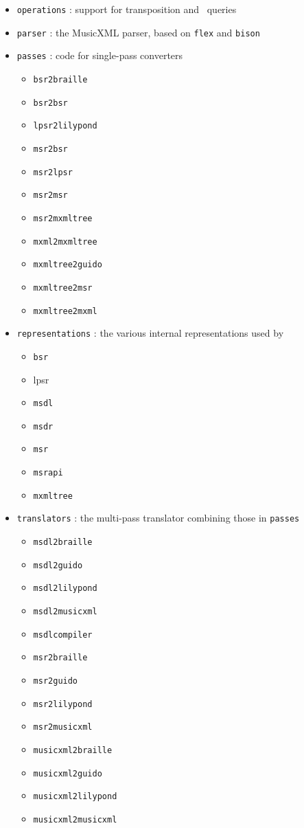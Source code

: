 \documentclass[12pt,a4paper]{article}
\begin{document}
\begin{itemize}
\item {\tt operations} : support for transposition and \mxml\ queries

\item {\tt parser} : the MusicXML parser, based on {\tt flex} and {\tt bison}

\item {\tt passes} : code for single-pass converters

  \begin{itemize}
  \item {\tt bsr2braille}
  \item {\tt bsr2bsr}
  \item {\tt lpsr2lilypond}
  \item {\tt msr2bsr}
  \item {\tt msr2lpsr}
  \item {\tt msr2msr}
  \item {\tt msr2mxmltree}
  \item {\tt mxml2mxmltree}
  \item {\tt mxmltree2guido}
  \item {\tt mxmltree2msr}
  \item {\tt mxmltree2mxml}
  \end{itemize}

\item {\tt representations} : the various internal representations used by \lib\

  \begin{itemize}
  \item {\tt bsr}
  \item {lpsr}
  \item {\tt msdl}
  \item {\tt msdr}
  \item {\tt msr}
  \item {\tt msrapi}
  \item {\tt mxmltree}
  \end{itemize}

\item {\tt translators} : the multi-pass translator combining those in {\tt passes}

  \begin{itemize}
  \item {\tt msdl2braille}
  \item {\tt msdl2guido}
  \item {\tt msdl2lilypond}
  \item {\tt msdl2musicxml}
  \item {\tt msdlcompiler}
  \item {\tt msr2braille}
  \item {\tt msr2guido}
  \item {\tt msr2lilypond}
  \item {\tt msr2musicxml}
  \item {\tt musicxml2braille}
  \item {\tt musicxml2guido}
  \item {\tt musicxml2lilypond}
  \item {\tt musicxml2musicxml}
  \end{itemize}


\end{itemize}
\end{document}
